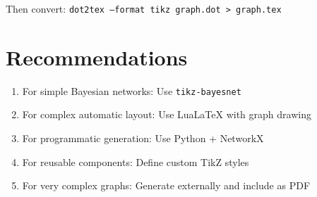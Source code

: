 \documentclass[11pt,a4paper]{article}
\begin{document}
Then convert: \texttt{dot2tex --format tikz graph.dot > graph.tex}

\section{Recommendations}

\begin{enumerate}
\item For simple Bayesian networks: Use \texttt{tikz-bayesnet}
\item For complex automatic layout: Use LuaLaTeX with graph drawing
\item For programmatic generation: Use Python + NetworkX
\item For reusable components: Define custom TikZ styles
\item For very complex graphs: Generate externally and include as PDF
\end{enumerate}
\end{document}
